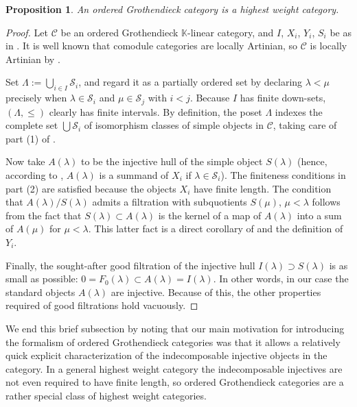 \documentclass[11pt]{article}
\theoremstyle{plain}
\newtheorem{proposition}[lemma]{Proposition}
\theoremstyle{nonumberplain}
\theoremstyle{plain}
\theoremstyle{nonumberplain}
\newtheorem{proof}{Proof}
\newcommand\bK{{\mathbb K}}
\newcommand\cC{{\mathcal C}}
\newcommand\cS{{\mathcal S}}
\begin{document}
\begin{proposition}\label{pr.hw}
  An ordered Grothendieck category is a highest weight category. 
\end{proposition}
\begin{proof}
  Let $\cC$ be an ordered Grothendieck $\bK$-linear category, and $I$, $X_i$, $Y_i$, $S_i$ be as in .  It is well known that comodule categories are locally Artinian, so $\cC$ is locally Artinian by . %

Set $\Lambda:=\bigcup_{i\in I}\cS_i$, and regard it as a partially ordered set by declaring $\lambda< \mu$ precisely when $\lambda\in \cS_i$ and $\mu\in \cS_j$ with $i<j$. Because $I$ has finite down-sets, $(\Lambda,\le)$ clearly has finite intervals. By definition, the poset $\Lambda$ indexes the complete set $\bigcup \cS_i$ of isomorphism classes of simple objects in $\cC$, taking care of part (1) of . 

Now take $A(\lambda)$ to be the injective hull of the simple object $S(\lambda)$ (hence, according to , $A(\lambda)$ is a summand of $X_i$ if $\lambda\in \cS_i$). The finiteness conditions in part (2) are satisfied because the objects $X_i$ have finite length. The condition that $A(\lambda)/S(\lambda)$ admits a filtration with subquotients $S(\mu)$, $\mu<\lambda$ follows from the fact that $S(\lambda)\subset A(\lambda)$ is the kernel of a map of $A(\lambda)$ into a sum of $A(\mu)$ for $\mu<\lambda$.  This latter fact is a direct corollary of  and the definition of $Y_i$.  %

Finally, the sought-after good filtration of the injective hull $I(\lambda)\supset S(\lambda)$ is as small as possible: $0=F_0(\lambda)\subset A(\lambda)=I(\lambda)$. In other words, in our case the standard objects $A(\lambda)$ are injective. Because of this, the other properties required of good filtrations hold vacuously. 
\end{proof}




We end this brief subsection by noting that our main motivation for introducing the formalism of ordered Grothendieck categories was that it allows a relatively quick explicit characterization of the indecomposable injective objects in the category.  In a general highest weight category the indecomposable injectives are not even required to have finite length, so ordered Grothendieck categories are a rather special class of highest weight categories.  %
\end{document}
